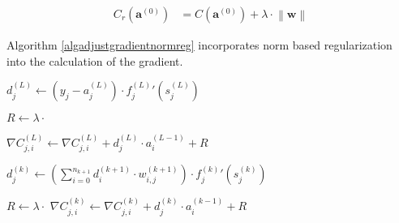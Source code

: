 \documentclass{article}
\begin{document}
          \begin{equation}
            \begin{split}
              C_r \left( \mathbf{a}^{(0)} \right)
                  & = C \left( \mathbf{a}^{(0)} \right)
                      +
                      \lambda \cdot \left\| \mathbf{w} \right\|
            \end{split}
          \end{equation}

          Algorithm \ref{algadjustgradientnormreg} incorporates norm based
          regularization into the calculation of the gradient.

          \begin{algorithm}
            \caption{%
              Modified version of algorithm \ref{algadjustgradient} with
              norm-based regularization.
            } \label{algadjustgradientnormreg}
            \begin{algorithmic}
                  \State $
                    d_j^{(L)} \gets
                      \left( y_j - a_j^{(L)} \right)
                      \cdot
                      {f_j^{(L)}}' \left( s_j^{(L)} \right)
                  $

                    \State $R \gets \lambda \cdot$ 

                    \State $
                      \nabla C_{j,i}^{(L)} \gets
                        \nabla C_{j,i}^{(L)} + d_j^{(L)} \cdot a_i^{(L-1)} + R
                    $
                  \EndFor
                \EndFor

                    \State $
                      d_j^{(k)} \gets
                        \left(
                          \sum_{i=0}^{n_{k+1}} d_i^{(k+1)} \cdot w_{i,j}^{(k+1)}
                        \right)
                        \cdot
                        {f_j^{(k)}}' \left( s_j^{(k)} \right)
                    $

                      \State $R \gets \lambda \cdot$ 
                      \State $
                        \nabla C_{j,i}^{(k)} \gets
                          \nabla C_{j,i}^{(k)} + d_j^{(k)} \cdot a_i^{(k-1)} + R
                      $
                    \EndFor
                  \EndFor
                \EndFor
              \EndProcedure
            \end{algorithmic}
          \end{algorithm}
\end{document}
